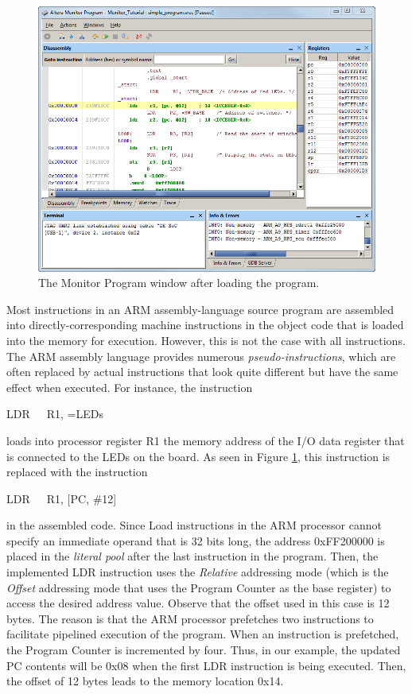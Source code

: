 \documentclass[11pt, twoside, pdftex]{article}
\begin{document}
\begin{figure}[H]
   \begin{center}
      \includegraphics[scale=0.6]{screenshots/figure18.png}
   \end{center}
   \caption{The Monitor Program window after loading the program.} 
   \label{fig: AMP_afterprogramload_arm}
\end{figure}


Most instructions in an ARM assembly-language source program are
assembled into directly-corresponding machine instructions in
the object code that is loaded into the memory for execution.
However, this is not the case with all instructions. The ARM
assembly language provides numerous {\it pseudo-instructions},
which are often replaced by actual instructions that look
quite different but have the same effect when executed.
For instance, the instruction 
\begin{center}
LDR~~~R1, =LEDs
\end{center}
\noindent
loads into processor register R1 the memory address of the I/O
data register that is connected to the LEDs on the board.
As seen in Figure \ref{fig: AMP_afterprogramload_arm}, this instruction is replaced with the 
instruction 
\begin{center}
LDR~~~R1, [PC, \#12]
\end{center}
\noindent
in the assembled code. Since Load instructions in the ARM
processor cannot specify an immediate operand that is 32 bits 
long, the address 0xFF200000 is placed in the {\it literal pool}
after the last instruction in the program. Then, the implemented
LDR instruction uses the {\it Relative} addressing mode (which
is the {\it Offset} addressing mode that uses the Program Counter
as the base register) to access the desired address value. Observe that the offset used in this case is 12 bytes.
The reason is that the ARM processor prefetches two instructions
to facilitate pipelined execution of the program. 
When an instruction is prefetched, the Program Counter is
incremented by four. Thus, in our example, the updated
PC contents will be 0x08 when the first LDR instruction is
being executed. Then, the offset of 12 bytes leads to the memory
location 0x14.
 
\end{document}
